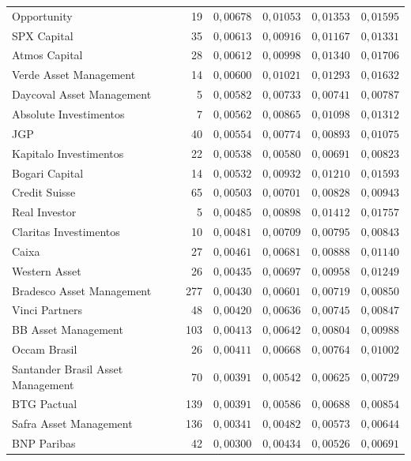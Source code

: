 \documentclass[11pt,a4paper]{article}
\begin{document}
\begin{center}
\begin{longtable}{@{}lrrrrr@{}}
Opportunity & 19 & $0{,}00678$ & $0{,}01053$ & $0{,}01353$ & $0{,}01595$ \\
SPX Capital & 35 & $0{,}00613$ & $0{,}00916$ & $0{,}01167$ & $0{,}01331$ \\
Atmos Capital & 28 & $0{,}00612$ & $0{,}00998$ & $0{,}01340$ & $0{,}01706$ \\
Verde Asset Management & 14 & $0{,}00600$ & $0{,}01021$ & $0{,}01293$ & $0{,}01632$ \\
Daycoval Asset Management & 5 & $0{,}00582$ & $0{,}00733$ & $0{,}00741$ & $0{,}00787$ \\
Absolute Investimentos & 7 & $0{,}00562$ & $0{,}00865$ & $0{,}01098$ & $0{,}01312$ \\
JGP & 40 & $0{,}00554$ & $0{,}00774$ & $0{,}00893$ & $0{,}01075$ \\
Kapitalo Investimentos & 22 & $0{,}00538$ & $0{,}00580$ & $0{,}00691$ & $0{,}00823$ \\
Bogari Capital & 14 & $0{,}00532$ & $0{,}00932$ & $0{,}01210$ & $0{,}01593$ \\
Credit Suisse & 65 & $0{,}00503$ & $0{,}00701$ & $0{,}00828$ & $0{,}00943$ \\
Real Investor & 5 & $0{,}00485$ & $0{,}00898$ & $0{,}01412$ & $0{,}01757$ \\
Claritas Investimentos & 10 & $0{,}00481$ & $0{,}00709$ & $0{,}00795$ & $0{,}00843$ \\
Caixa & 27 & $0{,}00461$ & $0{,}00681$ & $0{,}00888$ & $0{,}01140$ \\
Western Asset & 26 & $0{,}00435$ & $0{,}00697$ & $0{,}00958$ & $0{,}01249$ \\
Bradesco Asset Management & 277 & $0{,}00430$ & $0{,}00601$ & $0{,}00719$ & $0{,}00850$ \\
Vinci Partners & 48 & $0{,}00420$ & $0{,}00636$ & $0{,}00745$ & $0{,}00847$ \\
BB Asset Management & 103 & $0{,}00413$ & $0{,}00642$ & $0{,}00804$ & $0{,}00988$ \\
Occam Brasil & 26 & $0{,}00411$ & $0{,}00668$ & $0{,}00764$ & $0{,}01002$ \\
Santander Brasil Asset Management & 70 & $0{,}00391$ & $0{,}00542$ & $0{,}00625$ & $0{,}00729$ \\
BTG Pactual & 139 & $0{,}00391$ & $0{,}00586$ & $0{,}00688$ & $0{,}00854$ \\
Safra Asset Management & 136 & $0{,}00341$ & $0{,}00482$ & $0{,}00573$ & $0{,}00644$ \\
BNP Paribas & 42 & $0{,}00300$ & $0{,}00434$ & $0{,}00526$ & $0{,}00691$ \\

\end{longtable}
\end{center}
\end{document}
